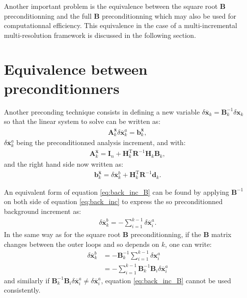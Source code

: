 \documentclass[npg, manuscript]{copernicus}
\begin{document}
Another important problem is the equivalence between the square root $\mathbf{B}$ preconditionning and the full $\mathbf{B}$ preconditionning which may also be used for computationnal efficiency. This equivalence in the case of a multi-incremental multi-resolution framework is discussed in the following section.


\section{Equivalence between preconditionners}
Another preconding technique consists in defining a new variable $\delta \overline{\mathbf{x}}_k = \mathbf{B}_k^{-1} \delta \mathbf{x}_k$ so that the linear system to solve can be written as:
\begin{align}
 \mathbf{A}^{\overline{\mathbf{x}}}_k \delta \overline{\mathbf{x}}^a_k = \mathbf{b}^{\overline{\mathbf{x}}}_k,
\end{align}
 $\delta \overline{\mathbf{x}}^a_k$ being the preconditionned analysis increment, and with:
 \begin{align}
  \mathbf{A}^{\overline{\mathbf{x}}}_k = \mathbf{I}_n + \mathbf{H}_k^\mathrm{T} \mathbf{R}^{-1} \mathbf{H}_k \mathbf{B}_k,
 \end{align}
 and the right hand side now written as:
 \begin{align}
  \mathbf{b}^{\overline{\mathbf{x}}}_k =  \delta \overline{\mathbf{x}}^b_k + \mathbf{H}_k^\mathrm{T} \mathbf{R}^{-1} \mathbf{d}_k.
 \end{align}
 
An equivalent form of equation \eqref{eq:back_inc_B} can be found by applying $\mathbf{B}^{-1}$ on both side of equation \eqref{eq:back_inc} to express the so preconditionned background increment as:
\begin{align}
\label{eq:back_inc_B}
\delta \overline{\mathbf{x}}^b_k = - \sum_{i=1}^{k-1} \delta \overline{\mathbf{x}}^a_i.
\end{align}
In the same way as for the square root $\mathbf{B}$ preconditionning, if the $\mathbf{B}$ matrix changes between the outer loops and so depends on $k$, one can write:
\begin{align}
\label{eq:back_inc_B_diff}
\delta \overline{\mathbf{x}}^b_k & = - \mathbf{B}_k^{-1}\sum_{i=1}^{k-1} \delta \mathbf{x}^a_i \nonumber \\
& = - \sum_{i=1}^{k-1} \mathbf{B}_k^{-1} \mathbf{B}_i \delta \overline{\mathbf{x}}^a_i
\end{align}
and similarly if $\mathbf{B}_k^{-1} \mathbf{B}_i \delta \overline{\mathbf{x}}^a_i \ne \delta \overline{\mathbf{x}}^a_i$, equation \eqref{eq:back_inc_B} cannot be used consistently.
\end{document}
